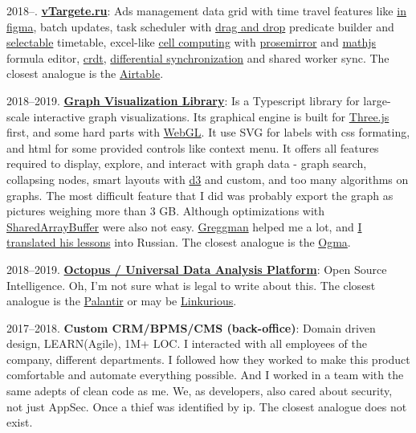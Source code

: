 \documentclass{yb}
\begin{document}
2018--. \href{https://vtargete.ru/}{\textbf{vTargete.ru}}: Ads management data grid 
with time travel features like \href{https://www.figma.com/blog/how-figmas-multiplayer-technology-works/}{in figma}, 
batch updates, 
task scheduler with \href{https://sortablejs.github.io/Sortable/}{drag and drop} predicate builder and \href{https://simonwep.github.io/selection/}{selectable} timetable, 
excel-like  \href{https://www.sciencedirect.com/topics/computer-science/calculation-formula}{cell computing} with \href{https://prosemirror.net/}{prosemirror} and \href{https://mathjs.org/}{mathjs} formula editor, \href{https://en.wikipedia.org/wiki/Conflict-free_replicated_data_type}{crdt}, \href{https://static.googleusercontent.com/media/research.google.com/ru//pubs/archive/35605.pdf}{differential synchronization} and shared worker sync. The closest analogue is the \href{https://www.airtable.com/}{Airtable}.

2018--2019. \href{https://baltinfocom.ru/BigData\#en}{\textbf{Graph Visualization Library}}: Is a Typescript library for large-scale interactive graph visualizations. Its graphical engine is built for \href{https://threejs.org/}{Three.js} first, and some hard parts with \href{https://webglfundamentals.org/}{WebGL}. It use SVG for labels with css formating, and html for some provided controls like context menu. It offers all features required to display, explore, and interact with graph data - graph search, collapsing nodes, smart layouts with \href{https://github.com/d3/d3-force}{d3} and custom, and too many algorithms on graphs. The most difficult feature that I did was probably export the graph as pictures weighing more than 3 GB. Although optimizations with \href{https://developer.mozilla.org/ru/docs/Web/JavaScript/Reference/Global_Objects/SharedArrayBuffer}{SharedArrayBuffer} were also not easy. \href{https://github.com/greggman}{Greggman} helped me a lot, and \href{https://webglfundamentals.org/}{I translated his lessons} into Russian. The closest analogue is the \href{https://doc.linkurio.us/ogma/latest/}{Ogma}.

2018--2019. \href{https://baltinfocom.ru/BigData\#en}{\textbf{Octopus / Universal Data Analysis Platform}}: Open Source Intelligence. Oh, I'm not sure what is legal to write about this.
The closest analogue is the \href{https://www.palantir.com/}{Palantir} or may be  \href{https://linkurio.us/}{Linkurious}.

2017--2018. \textbf{Custom CRM/BPMS/CMS (back-office)}: 
Domain driven design, LEARN(Agile), 1M+ LOC. I interacted with all employees of the company, different departments. I followed how they worked to make this product comfortable and automate everything possible. And I worked in a team with the same adepts of clean code as me. We, as developers, also cared about security, not just AppSec. Once a thief was identified by ip. The closest analogue does not exist. 
\end{document}
